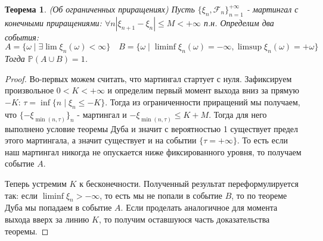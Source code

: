 \documentclass[12pt,a4paper]{article} %
\newtheorem{theorem}{Теорема}
\newcommand{\PR}{\mathbb{P}}
\newcommand{\F}{\mathcal{F}}
\begin{document}
	\begin{theorem}
		(Об ограниченных приращениях) Пусть $\{\xi_n,\F_n\}_{n=1}^{+\infty}$ - мартингал с конечными приращениями: $\forall n |\xi_{n+1}-\xi_n|\leq M<+\infty$ п.н. Определим два события:
		$$A=\{\omega\mid\exists\lim\xi_n(\omega)<\infty\}\quad B=\{\omega\mid\liminf\xi_n(\omega)=-\infty,\limsup\xi_n(\omega)=+\omega\}$$
		Тогда $\PR(A\cup B)=1$.
	\end{theorem}
	\begin{proof}
		Во-первых можем считать, что мартингал стартует с нуля. Зафиксируем произвольное $0<K<+\infty$ и определим первый момент выхода вниз за прямую $-K$: $\tau=\inf\{n\mid\xi_n\leq-K\}$. Тогда из ограниченности приращений мы получаем, что $\{-\xi_{\min(n,\tau)}\}_n$ - мартингал и $-\xi_{\min(n,\tau)}\leq K+M$. Тогда для него выполнено условие теоремы Дуба и значит с вероятностью 1 существует предел этого мартингала, а значит существует и на событии $\{\tau=+\infty\}$. То есть если наш мартингал никогда не опускается ниже фиксированного уровня, то получаем событие $A$.
		
		Теперь устремим $K$ к бесконечности. Полученный результат переформулируется так: если $\liminf\xi_n>-\infty$, то есть мы не попали в событие $B$, то по теореме Дуба мы попадаем в событие $A$. Если проделать аналогичное для момента выхода вверх за линию $K$, то получим оставшуюся часть доказательства теоремы.
	\end{proof}
\end{document}
